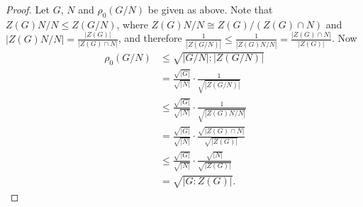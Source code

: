 \documentclass[10pt,a4paper]{amsart}
\begin{document}
\begin{proof} Let $G$, $N$ and $\rho_0(G/N)$ be given as above. Note that $Z(G)N/N \leq Z(G/N)$, where $Z(G)N/N \cong Z(G)/(Z(G) \cap N)$ and $|Z(G)N/N| = \frac{|Z(G)|}{|Z(G) \cap N|}$, and therefore $\frac{1}{|Z(G/N)|} \leq \frac{1}{|Z(G)N/N|} = \frac{|Z(G) \cap N|}{|Z(G)|}$. Now
\begin{align*}\rho_0(G/N) &\leq \sqrt{|G/N|:|Z(G/N)|} \\
                          &= \frac{\sqrt{|G|}}{\sqrt{|N|}}\cdot\frac{1}{\sqrt{|Z(G/N)|}} \\
                          &\leq \frac{\sqrt{|G|}}{\sqrt{|N|}}\cdot\frac{1}{\sqrt{|Z(G)N/N|}} \\
                          &= \frac{\sqrt{|G|}}{\sqrt{|N|}}\cdot\frac{\sqrt{|Z(G) \cap N|}}{\sqrt{|Z(G)|}} \\
                          &\leq \frac{\sqrt{|G|}}{\sqrt{|N|}}\cdot\frac{\sqrt{|N|}}{\sqrt{|Z(G)|}} \\
                          &= \sqrt{|G:Z(G)|}.
\end{align*}
\end{proof}
\end{document}
